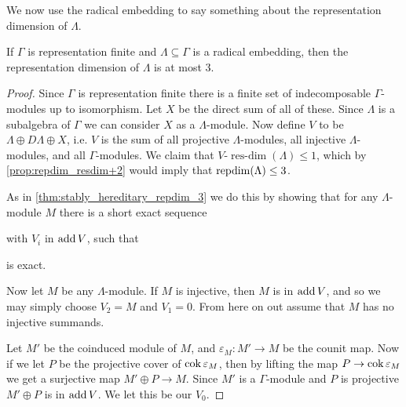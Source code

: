 We now use the radical embedding to say something about the representation dimension of $\Lambda$.

\begin{theorem}\cite[Theorem~1.1]{EHIS04}\label{thm:radical_embedding_repdim_3}
	If $\Gamma$ is representation finite and $\Lambda \subseteq \Gamma$ is a radical embedding, then the representation dimension of $\Lambda$ is at most 3.
	\begin{proof}
		Since $\Gamma$ is representation finite there is a finite set of indecomposable $\Gamma$-modules up to isomorphism. Let $X$ be the direct sum of all of these. Since $\Lambda$ is a subalgebra of $\Gamma$ we can consider $X$ as a $\Lambda$-module. Now define $V$ to be $\Lambda \oplus D\Lambda \oplus X$, i.e. $V$ is the sum of all projective $\Lambda$-modules, all injective $\Lambda$-modules, and all $\Gamma$-modules. We claim that $V$-$\operatorname{res-dim}(\Lambda) \leq 1$, which by \cref{prop:repdim_resdim+2} would imply that $\operatorname{repdim}(\Lambda) \leq 3$.
		
		As in \cref{thm:stably_hereditary_repdim_3} we do this by showing that for any  $\Lambda$-module $M$ there is a short exact sequence
		\begin{center}
		\end{center}
		with $V_i$ in $\operatorname{add} V$, such that 
		\begin{center}
		\end{center}
		is exact. 
		
		Now let $M$ be any $\Lambda$-module. If $M$ is injective, then $M$ is in $\operatorname{add} V$, and so we may simply choose $V_2 = M$ and $V_1=0$. From here on out assume that $M$ has no injective summands. 
		
		Let $M'$ be the coinduced module of $M$, and $\varepsilon_M\colon M' \to M$ be the counit map. Now if we let $P$ be the projective cover of $\operatorname{cok} \varepsilon_M$, then by lifting the map $P \to \operatorname{cok}\varepsilon_M$ we get a surjective map $M' \oplus P \to M$. Since $M'$ is a $\Gamma$-module and $P$ is projective $M'\oplus P$ is in $\operatorname{add} V$. We let this be our $V_0$.
		

\end{proof}
\end{theorem}
